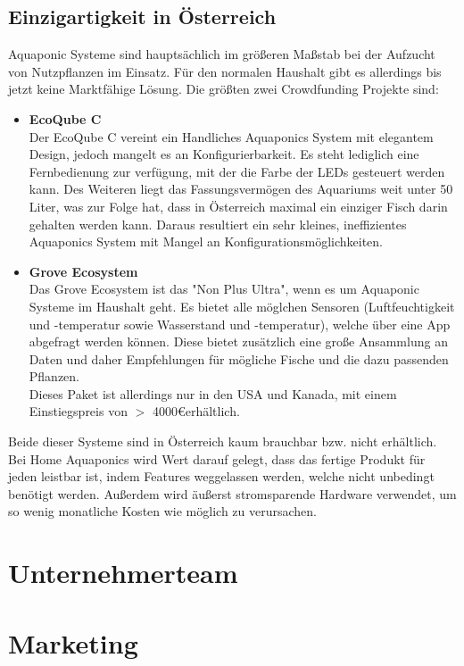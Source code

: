 \documentclass[11pt]{article}
\begin{document}
\subsection{Einzigartigkeit in \"Osterreich}
Aquaponic Systeme sind haupts\"achlich im gr\"o{\ss}eren Ma{\ss}stab bei der Aufzucht von Nutzpflanzen im Einsatz. F\"ur den normalen Haushalt gibt es allerdings bis jetzt keine Marktf\"ahige L\"osung. Die gr\"o{\ss}ten zwei Crowdfunding Projekte sind:
\begin{itemize}
	\item \textbf{EcoQube C}\\
	Der EcoQube C vereint ein Handliches Aquaponics System mit elegantem Design, jedoch mangelt es an Konfigurierbarkeit. Es steht lediglich eine Fernbedienung zur verf\"ugung, mit der die Farbe der LEDs gesteuert werden kann. Des Weiteren liegt das Fassungsverm\"ogen des Aquariums weit unter 50 Liter, was zur Folge hat, dass in \"Osterreich maximal ein einziger Fisch darin gehalten werden kann. Daraus resultiert ein sehr kleines, ineffizientes Aquaponics System mit Mangel an Konfigurationsm\"oglichkeiten. \\
	\item \textbf{Grove Ecosystem}\\
	Das Grove Ecosystem ist das "Non Plus Ultra", wenn es um Aquaponic Systeme im Haushalt geht. Es bietet alle m\"oglchen Sensoren (Luftfeuchtigkeit und -temperatur sowie Wasserstand und -temperatur), welche \"uber eine App abgefragt werden k\"onnen. Diese bietet zus\"atzlich eine gro{\ss}e Ansammlung an Daten und daher Empfehlungen f\"ur m\"ogliche Fische und die dazu passenden Pflanzen. \\
	Dieses Paket ist allerdings nur in den USA und Kanada, mit einem Einstiegspreis von $>$ 4000\euro\hspace{0.5em}erh\"altlich.
\end{itemize}
Beide dieser Systeme sind in \"Osterreich kaum brauchbar bzw. nicht erh\"altlich. Bei Home Aquaponics wird Wert darauf gelegt, dass das fertige Produkt f\"ur jeden leistbar ist, indem Features weggelassen werden, welche nicht unbedingt ben\"otigt werden. Au{\ss}erdem wird \"au{\ss}erst stromsparende Hardware verwendet, um so wenig monatliche Kosten wie m\"oglich zu verursachen.

\section{Unternehmerteam}
\section{Marketing}
\end{document}
